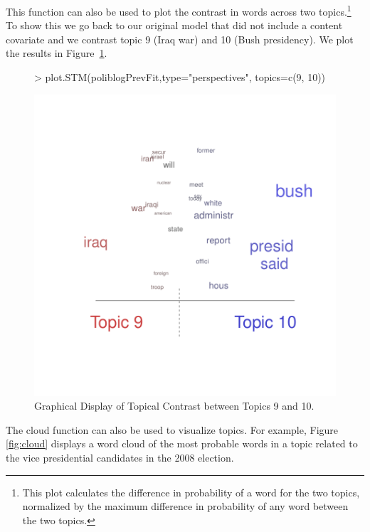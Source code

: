 \documentclass[nojss]{jss}
\begin{document}
This function can also be used to plot the contrast in words across two topics.\footnote{This plot calculates the difference in probability of a word for the two topics, normalized by the maximum difference in probability of any word between the two topics.} To show this we go back to our original model that did not include a content covariate and we contrast topic 9 (Iraq war) and 10 (Bush presidency). We plot the results in Figure~\ref{fig:perp2}.

\begin{figure}
\begin{center}
\begin{Schunk}
\begin{Sinput}
> plot.STM(poliblogPrevFit,type="perspectives", topics=c(9, 10))
\end{Sinput}
\end{Schunk}
\includegraphics{stmVignette-019}
\caption{Graphical Display of Topical Contrast between Topics 9 and 10.}
\label{fig:perp2}
\end{center}
\end{figure}

The cloud function can also be used to visualize topics.  For example, Figure \ref{fig:cloud} displays a word cloud of the most probable words in a topic related to the vice presidential candidates in the 2008 election.
\end{document}
